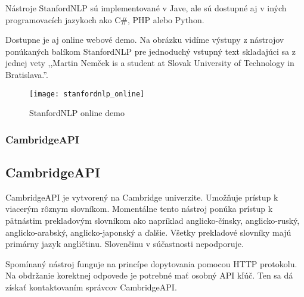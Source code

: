 Nástroje StanfordNLP sú implementované v Jave, ale sú dostupné aj v iných programovacích jazykoch ako C\#, PHP alebo Python.

Dostupne je aj online webové demo. Na obrázku  vidíme výstupy z nástrojov ponúkaných balíkom StanfordNLP pre jednoduchý vstupný text skladajúci sa z jednej vety ,,Martin Nemček is a student at Slovak University of Technology in Bratislava.''.

\begin{figure}[H]
\begin{center}\texttt{[image: stanfordnlp\_online]}\end{center}
\caption[StanfordNLP online demo]{StanfordNLP online demo}\label{fig:stanfordnlp_online_demo}
\end{figure}

%
%
{
	\subsubsection{CambridgeAPI}
}
{
	\subsection{CambridgeAPI}
}
\label{subsubsec:cambridgeapi}
CambridgeAPI je vytvorený na Cambridge univerzite. Umožňuje prístup k viacerým rôznym slovníkom. Momentálne tento nástroj ponúka prístup k pätnástim prekladovým slovníkom ako napríklad anglicko-čínsky, anglicko-ruský, anglicko-arabský, anglicko-japonský a ďalšie. Všetky prekladové slovníky majú primárny jazyk angličtinu. Slovenčinu v súčastnosti nepodporuje.

Spomínaný nástroj funguje na princípe dopytovania pomocou HTTP protokolu. Na obdržanie korektnej odpovede je potrebné mať osobný API kľúč. Ten sa dá získať kontaktovaním správcov CambridgeAPI.

